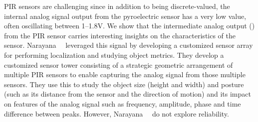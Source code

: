 PIR sensors are challenging since in addition to being discrete-valued, the internal analog signal output from the pyroelectric sensor has a very low value, often oscillating between 1--1.8V. We show that the intermediate analog output (\aout) from the PIR sensor carries interesting insights on the characteristics of the sensor. Narayana~\etal~\cite{narayana2015pir} leveraged this signal %
by developing a customized sensor array %
for performing localization and studying object metrics. They develop a customized sensor tower consisting of a strategic geometric arrangement of multiple PIR sensors to enable capturing the analog signal from those multiple sensors. They use this to study the object size (height and width) and posture (such as its distance from the sensor and the direction of motion) and its impact on features of the analog signal such as frequency, amplitude, phase and time difference between peaks. 
%
%
However, Narayana~\etal~\cite{narayana2015pir} do not explore reliability.%
%






